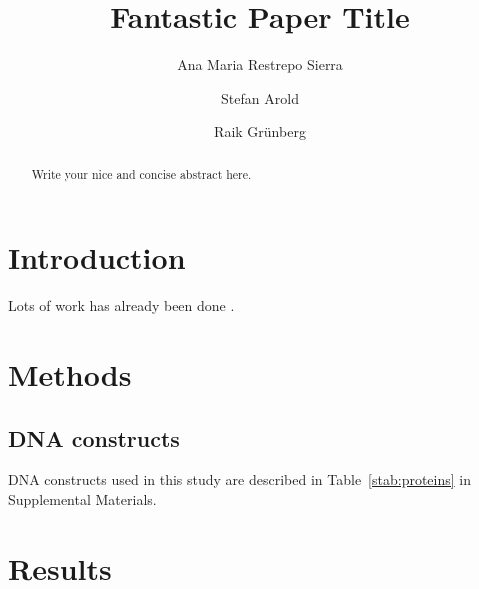 \documentclass[10pt]{article}
\begin{document}
\title{Fantastic Paper Title}

\author[1,2]{Ana Maria Restrepo Sierra}
\author[1]{Stefan Arold}
\author[1]{Raik Gr\"unberg}

\date{}                %

\maketitle
{} %
\newpage


\begin{abstract}
Write your nice and concise abstract here.
\end{abstract}


\section*{Introduction}

Lots of work has already been done \cite{Buchner1897}. 

\section*{Methods}

\subsection*{DNA constructs}
DNA constructs used in this study are described in Table~\ref{stab:proteins} in Supplemental Materials. 


\section*{Results}
\end{document}
